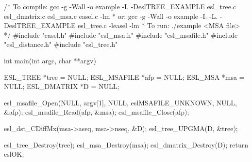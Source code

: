 \begin{cchunk}
/* To compile: gcc -g -Wall -o example -I. -DeslTREE_EXAMPLE esl_tree.c esl_dmatrix.c esl_msa.c easel.c -lm
 *         or: gcc -g -Wall -o example -I. -L. -DeslTREE_EXAMPLE esl_tree.c -leasel -lm
 *     To run: ./example <MSA file>
 */
#include "easel.h"
#include "esl_msa.h"
#include "esl_msafile.h"
#include "esl_distance.h"
#include "esl_tree.h"

int main(int argc, char **argv)
{
  ESL_TREE     *tree = NULL;
  ESL_MSAFILE  *afp  = NULL;
  ESL_MSA      *msa  = NULL;
  ESL_DMATRIX  *D    = NULL;

  esl_msafile_Open(NULL, argv[1], NULL, eslMSAFILE_UNKNOWN, NULL, &afp);
  esl_msafile_Read(afp, &msa);
  esl_msafile_Close(afp);

  esl_dst_CDiffMx(msa->aseq, msa->nseq, &D);
  esl_tree_UPGMA(D, &tree);

  esl_tree_Destroy(tree);
  esl_msa_Destroy(msa);
  esl_dmatrix_Destroy(D);
  return eslOK;
}
\end{cchunk}
